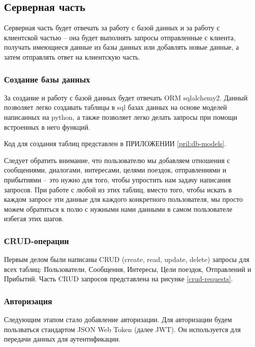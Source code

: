 \subsection{Серверная часть}

Серверная часть будет отвечать за работу с базой данных и за работу с клиентской частью -- она будет выполнять запросы отправленные с клиента, получать имеющиеся данные из базы данных или добавлять новые данные, а затем отправлять ответ на клиентскую часть.

\subsubsection{Создание базы данных}

За создание и работу с базой данных будет отвечать ORM sqlalchemy2. Данный позволяет легко создавать таблицы в sql базах данных на основе моделей написанных на python, а также позволяет легко делать запросы при помощи встроенных в него функций.

Код для создания таблиц представлен в ПРИЛОЖЕНИИ \ref{pril:db-models}.

Следует обратить внимание, что пользователю мы добавляем отношения с сообщениями, диалогами, интересами, целями поездок, отправлениями и прибытиями -- это нужно для того, чтобы упростить нам задачу написания запросов. При работе с любой из этих таблиц, вместо того, чтобы искать в каждом запросе эти данные для каждого конкретного пользователя, мы просто можем обратиться к полю с нужными нами данными в самом пользователе избегая этих шагов.

\subsubsection{СRUD-операции}

Первым делом были написаны CRUD (create, read, update, delete) запросы для всех таблиц: Пользователи, Сообщения, Интересы, Цели поездок, Отправлений и Прибытий. Часть CRUD запросов представлена на рисунке \ref{crud-requests}.


\subsubsection{Авторизация}

Следующим этапом стало добавление авторизации. Для авторизации будем пользваться стандартом JSON Web Token (далее JWT). Он используется для передачи данных для аутентификации.

